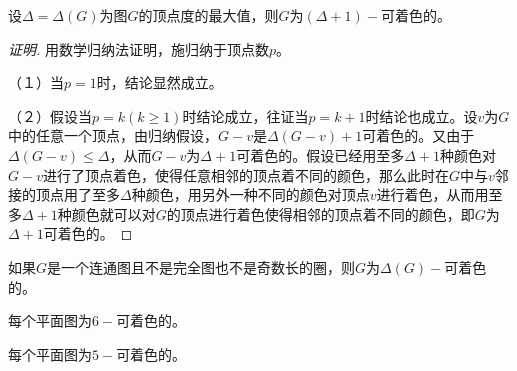   \begin{Thm}
    设$\Delta = \Delta (G)$为图$G$的顶点度的最大值，则$G$为$(\Delta+1)-$可着色的。
  \end{Thm}
  \begin{proof}[证明]用数学归纳法证明，施归纳于顶点数$p$。

    （１）当$p=1$时，结论显然成立。

    （２）假设当$p=k(k\geq 1)$时结论成立，往证当$p=k+1$时结论也成立。设$v$为$G$中的任意一个顶点，由归纳假设，$G-v$是$\Delta(G-v)+1$可着色的。又由于$\Delta(G-v) \leq \Delta$，从而$G-v$为$\Delta+1$可着色的。假设已经用至多$\Delta+1$种颜色对$G-v$进行了顶点着色，使得任意相邻的顶点着不同的颜色，那么此时在$G$中与$v$邻接的顶点用了至多$\Delta$种颜色，用另外一种不同的颜色对顶点$v$进行着色，从而用至多$\Delta+1$种颜色就可以对$G$的顶点进行着色使得相邻的顶点着不同的颜色，即$G$为$\Delta + 1$可着色的。
    
  \end{proof}
  \begin{Thm}
    如果$G$是一个连通图且不是完全图也不是奇数长的圈，则$G$为$\Delta(G)-$可着色的。
  \end{Thm}
  \begin{Thm}
    每个平面图为$6-$可着色的。
  \end{Thm}
  \begin{Thm}
    每个平面图为$5-$可着色的。
  \end{Thm}
